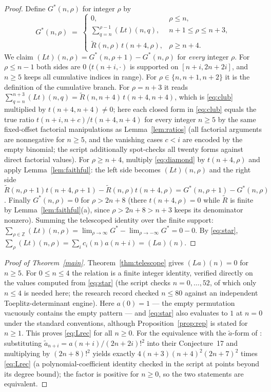 \documentclass[11pt]{article}
\theoremstyle{plain}
\theoremstyle{definition}
\theoremstyle{remark}
\newcommand{\Lop}{L}
\newcommand{\Rt}{\widetilde{R}}
\newcommand{\ZZ}{\mathbb{Z}}
\begin{document}
\begin{proof}
Define $G^{*}(n,\rho)$ for integer $\rho$ by
\[
  G^{*}(n,\rho)\;=\;
  \begin{cases}
    0, & \rho\le n,\\[1pt]
    \displaystyle\sum_{q=n}^{\rho-1}(\Lop t)(n,q), & n+1\le\rho\le n+3,\\[6pt]
    \Rt(n,\rho)\,t(n{+}4,\rho), & \rho\ge n+4.
  \end{cases}
\]
We claim $(\Lop t)(n,\rho)=G^{*}(n,\rho{+}1)-G^{*}(n,\rho)$ for \emph{every} integer $\rho$.
For $\rho\le n-1$ both sides are $0$ ($t(n{+}i,\cdot)$ is supported on $[n{+}i,2n{+}2i]$, and
$n\ge5$ keeps all cumulative indices in range). For $\rho\in\{n,n{+}1,n{+}2\}$ it is the
definition of the cumulative branch. For $\rho=n+3$ it reads
$\sum_{q=n}^{n+3}(\Lop t)(n,q)=\Rt(n,n{+}4)\,t(n{+}4,n{+}4)$, which is \eqref{eq:club}
multiplied by $t(n{+}4,n{+}4)\neq0$; here each closed form in \eqref{eq:club} equals the true
ratio $t(n{+}i,n{+}c)/t(n{+}4,n{+}4)$ for every integer $n\ge5$ by the same fixed-offset
factorial manipulations as Lemma~\ref{lem:ratios} (all factorial arguments are nonnegative for
$n\ge5$, and the vanishing cases $c<i$ are encoded by the empty binomial; the script additionally
spot-checks all twenty forms against direct factorial values). For $\rho\ge n+4$, multiply
\eqref{eq:diamond} by $t(n{+}4,\rho)$ and apply Lemma~\ref{lem:faithful}:
the left side becomes $(\Lop t)(n,\rho)$ and the right side
$\Rt(n,\rho{+}1)t(n{+}4,\rho{+}1)-\Rt(n,\rho)t(n{+}4,\rho)=G^{*}(n,\rho{+}1)-G^{*}(n,\rho)$.
Finally $G^{*}(n,\rho)=0$ for $\rho>2n+8$ (there $t(n{+}4,\rho)=0$ while $\Rt$ is finite by
Lemma~\ref{lem:faithful}(a), since $\rho>2n+8>n+3$ keeps its denominator nonzero). Summing the
telescoped identity over the finite support: $\sum_{\rho\in\ZZ}(\Lop t)(n,\rho)=
\lim_{\rho\to\infty}G^{*}-\lim_{\rho\to-\infty}G^{*}=0-0$. By \eqref{eq:star},
$\sum_{\rho}(\Lop t)(n,\rho)=\sum_i c_i(n)a(n{+}i)=(\Lop a)(n)$.
\end{proof}

\begin{proof}[Proof of Theorem~\ref{main}]
Theorem~\ref{thm:telescope} gives $(\Lop a)(n)=0$ for $n\ge5$. For $0\le n\le4$ the relation is
a finite integer identity, verified directly on the values computed from \eqref{eq:star} (the
script checks $n=0,\dots,52$, of which only $n\le4$ is needed here; the research record checked
$n\le80$ against an independent Toeplitz-determinant engine). Here $a(0)=1$ --- the empty
permutation vacuously contains the empty pattern --- and \eqref{eq:star} also evaluates to $1$
at $n=0$ under the standard conventions, although Proposition~\ref{prop:rep} is stated for
$n\ge1$. This proves \eqref{eq:Lrec} for all $n\ge0$. For the equivalence
with the $\tilde a$-form of \cite{KK23}: substituting $\tilde a_{n+i}=a(n{+}i)/(2n{+}2i)!^{2}$
into their Conjecture~17 and multiplying by $(2n{+}8)!^{2}$ yields exactly
$4(n{+}3)(n{+}4)^2(2n{+}7)^2$ times \eqref{eq:Lrec} (a polynomial-coefficient identity checked in
the script at points beyond its degree bound); the factor is positive for $n\ge0$, so the two
statements are equivalent.
\end{proof}
\end{document}
